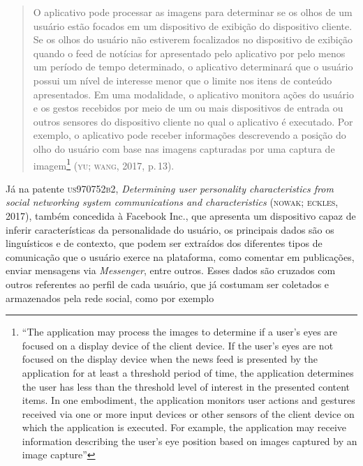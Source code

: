 \begin{quote}
O aplicativo pode processar as imagens para determinar se os olhos de um
usuário estão focados em um dispositivo de exibição do dispositivo
cliente. Se os olhos do usuário não estiverem focalizados no dispositivo
de exibição quando o feed de notícias for apresentado pelo aplicativo
por pelo menos um período de tempo determinado, o aplicativo determinará
que o usuário possui um nível de interesse menor que o limite nos itens
de conteúdo apresentados. Em uma modalidade, o aplicativo monitora ações
do usuário e os gestos recebidos por meio de um ou mais dispositivos de
entrada ou outros sensores do dispositivo cliente no qual o aplicativo é
executado. Por exemplo, o aplicativo pode receber informações
descrevendo a posição do olho do usuário com base nas imagens capturadas
por uma captura de imagem\footnote{``The application may process the
  images to determine if a user's eyes are focused on a display device
  of the client device. If the user's eyes are not focused on the
  display device when the news feed is presented by the application for
  at least a threshold period of time, the application determines the
  user has less than the threshold level of interest in the presented
  content items. In one embodiment, the application monitors user
  actions and gestures received via one or more input devices or other
  sensors of the client device on which the application is executed. For
  example, the application may receive information describing the user's
  eye position based on images captured by an image capture''} (\textsc{yu};
\textsc{wang}, 2017, p.\,13).
\end{quote}

Já na patente \textsc{us970752b2}, \emph{Determining user personality
characteristics from social networking system communications and
characteristics} (\textsc{nowak}; \textsc{eckles}, 2017), também concedida à
Facebook Inc., que apresenta um dispositivo capaz de inferir
características da personalidade do usuário, os principais dados são os
linguísticos e de contexto, que podem ser extraídos dos diferentes tipos
de comunicação que o usuário exerce na plataforma, como comentar em
publicações, enviar mensagens via \emph{Messenger}, entre outros. Esses
dados são cruzados com outros referentes ao perfil de cada usuário, que
já costumam ser coletados e armazenados pela rede social, como por
exemplo


